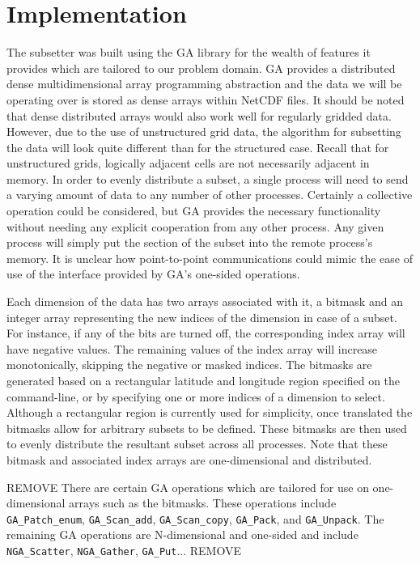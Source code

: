 \section{Implementation}
\label{section:implementation}

The subsetter was built using the GA library for the wealth of features it
provides which are tailored to our problem domain.  GA provides a distributed
dense multidimensional array programming abstraction and the data we will be
operating over is stored as dense arrays within NetCDF files.  It should be
noted that dense distributed arrays would also work well for regularly gridded
data.  However, due to the use of unstructured grid data, the algorithm for
subsetting the data will look quite different than for the structured case.
Recall that for unstructured grids, logically adjacent cells are not
necessarily adjacent in memory.  In order to evenly distribute a subset, a
single process will need to send a varying amount of data to any number of
other processes.  Certainly a collective operation could be considered, but GA
provides the necessary functionality without needing any explicit cooperation
from any other process.  Any given process will simply put the section of the
subset into the remote process's memory.  It is unclear how point-to-point
communications could mimic the ease of use of the interface provided by GA's
one-sided operations.

Each dimension of the data has two arrays associated with it, a bitmask and an
integer array representing the new indices of the dimension in case of a
subset.  For instance, if any of the bits are turned off, the corresponding
index array will have negative values.  The remaining values of the index
array will increase monotonically, skipping the negative or masked indices.
The bitmasks are generated based on a rectangular latitude and longitude
region specified on the command-line, or by specifying one or more indices of
a dimension to select.  Although a rectangular region is currently used for
simplicity, once translated the bitmasks allow for arbitrary subsets to be
defined.  These bitmasks are then used to evenly distribute the resultant
subset across all processes.  Note that these bitmask and associated index
arrays are one-dimensional and distributed.

REMOVE
There are certain GA operations which are tailored for use on one-dimensional
arrays such as the bitmasks.  These operations include \verb=GA_Patch_enum=,
\verb=GA_Scan_add=, \verb=GA_Scan_copy=, \verb=GA_Pack=, and \verb=GA_Unpack=.
The remaining GA operations are N-dimensional and one-sided and include
\verb=NGA_Scatter=, \verb=NGA_Gather=, \verb=GA_Put=...
REMOVE

